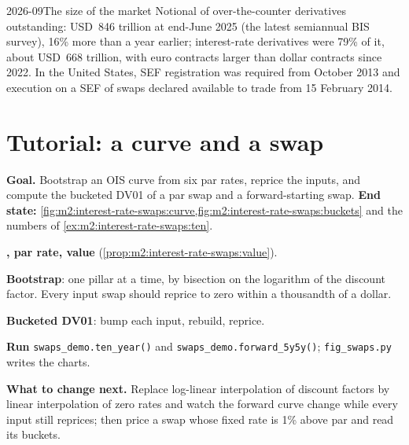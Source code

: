 \begin{dated}{2026-09}{The size of the market}\label{dat:m2:interest-rate-swaps:market}
Notional of over-the-counter derivatives outstanding: USD~846 trillion at
end-June 2025 (the latest semiannual BIS survey), 16\% more than a year earlier;
interest-rate derivatives were 79\% of it, about USD~668 trillion, with euro
contracts larger than dollar contracts since 2022. In the United States, SEF
registration was required from October 2013 and execution on a SEF of swaps
declared available to trade from 15 February 2014.
\end{dated}

\section{Tutorial: a curve and a swap}\label{tut:m2:interest-rate-swaps:curve}

\begin{tutorial}
\textbf{Goal.} Bootstrap an OIS curve from six par rates, reprice the inputs,
and compute the bucketed DV01 of a par swap and a forward-starting swap.
\textbf{End state:}
\cref{fig:m2:interest-rate-swaps:curve,fig:m2:interest-rate-swaps:buckets} and the
numbers of \cref{ex:m2:interest-rate-swaps:ten}.
\begin{tutsteps}
\item \textbf{, par rate, value} (\cref{prop:m2:interest-rate-swaps:value}).
\label{lst:m2:interest-rate-swaps:value}
\item \textbf{Bootstrap}: one pillar at a time, by bisection on the logarithm of
the discount factor.
\label{lst:m2:interest-rate-swaps:bootstrap}
Every input swap should reprice to zero within a thousandth of a dollar.
\item \textbf{Bucketed DV01}: bump each input, rebuild, reprice.
\label{lst:m2:interest-rate-swaps:buckets}
\item \textbf{Run} \texttt{swaps\_demo.ten\_year()} and
\texttt{swaps\_demo.forward\_5y5y()}; \texttt{fig\_swaps.py} writes the charts.
\end{tutsteps}
\textbf{What to change next.} Replace log-linear interpolation of discount
factors by linear interpolation of zero rates and watch the forward curve
change while every input still reprices; then price a swap whose fixed rate is
1\% above par and read its buckets.
\end{tutorial}

